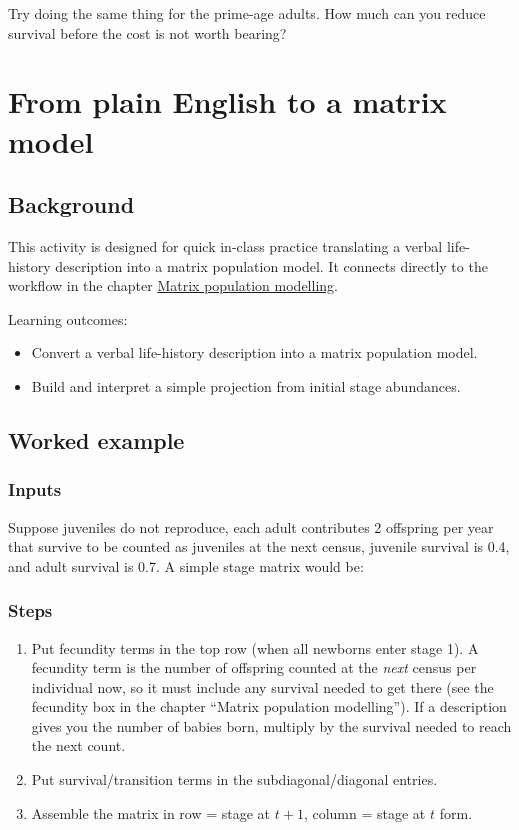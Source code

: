 \documentclass[
  a4paper]{book}
\providecommand{\tightlist}{%
  \setlength{\itemsep}{0pt}\setlength{\parskip}{0pt}}
\begin{document}
Try doing the same thing for the prime-age adults. How much can you reduce survival before the cost is not worth bearing?

\chapter{From plain English to a matrix model}\label{from-plain-english-to-a-matrix-model}

\section{Background}\label{background-20}

This activity is designed for quick in-class practice translating a verbal life-history description into a matrix population model. It connects directly to the workflow in the chapter \hyperref[matrix-population-modelling]{Matrix population modelling}.

Learning outcomes:

\begin{itemize}
\tightlist
\item
  Convert a verbal life-history description into a matrix population model.
\item
  Build and interpret a simple projection from initial stage abundances.
\end{itemize}

\section{Worked example}\label{worked-example-10}

\subsection{Inputs}\label{inputs-7}

Suppose juveniles do not reproduce, each adult contributes 2 offspring per year that survive to be counted as juveniles at the next census, juvenile survival is 0.4, and adult survival is 0.7. A simple stage matrix would be:

\subsection{Steps}\label{steps-7}

\begin{enumerate}
\def\labelenumi{\arabic{enumi}.}
\tightlist
\item
  Put fecundity terms in the top row (when all newborns enter stage 1). A fecundity term is the number of offspring counted at the \emph{next} census per individual now, so it must include any survival needed to get there (see the fecundity box in the chapter ``Matrix population modelling''). If a description gives you the number of babies born, multiply by the survival needed to reach the next count.
\item
  Put survival/transition terms in the subdiagonal/diagonal entries.
\item
  Assemble the matrix in row = stage at \(t+1\), column = stage at \(t\) form.
\end{enumerate}
\end{document}
